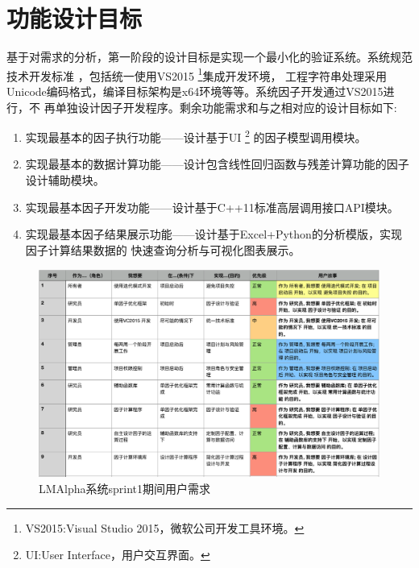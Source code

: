 \section{功能设计目标}

基于对需求的分析，第一阶段的设计目标是实现一个最小化的验证系统。系统规范技术开发标准
，包括统一使用VS2015
\footnote{VS2015:Visual Studio 2015，微软公司开发工具环境。}集成开发环境，
工程字符串处理采用Unicode编码格式，编译目标架构是x64环境等等。系统因子开发通过VS2015进行，不
再单独设计因子开发程序。剩余功能需求和与之相对应的设计目标如下:



\begin{enumerate}

\item 实现最基本的因子执行功能——设计基于UI
\label{func_ui}
\footnote{UI:User Interface，用户交互界面。}
的因子模型调用模块。

\item 实现最基本的数据计算功能——设计包含线性回归函数与残差计算功能的因子设计辅助模块。
\label{func_lmlib}

\item 实现最基本因子开发功能——设计基于C++11标准高层调用接口API模块。
\label{func_lmapi}

\item 实现最基本因子结果展示功能——设计基于Excel+Python的分析模版，实现因子计算结果数据的
快速查询分析与可视化图表展示。
\label{func_dashboard}
\end{enumerate}

\begin{figure}[ht]
\centering
\includegraphics[width=14cm]{sprint1-userstories.png}
\caption{LMAlpha系统sprint1期间用户需求}
\label{fig:s1-userstories}
\end{figure}

